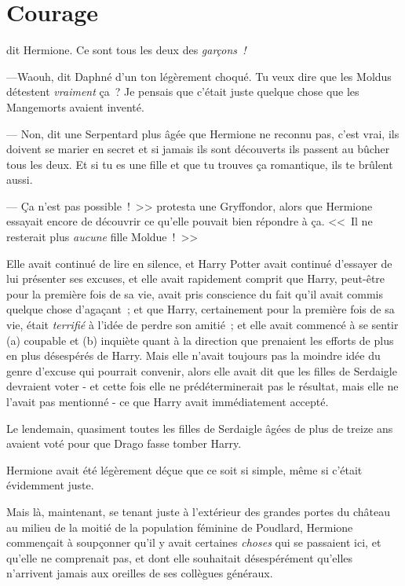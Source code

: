\chapter{Courage}

 dit Hermione. Ce sont tous les deux des \emph{garçons~!}

\hplettrineextrapara
---Waouh, dit Daphné d'un ton légèrement choqué. Tu veux dire que les Moldus détestent \emph{vraiment} ça~? Je pensais que c'était juste quelque chose que les Mangemorts avaient inventé.

--- Non, dit une Serpentard plus âgée que Hermione ne reconnu pas, c'est vrai, ils doivent se marier en secret et si jamais ils sont découverts ils passent au bûcher tous les deux. Et si tu es une fille et que tu trouves ça romantique, ils te brûlent aussi.

--- Ça n'est pas possible~!~>> protesta une Gryffondor, alors que Hermione essayait encore de découvrir ce qu'elle pouvait bien répondre à ça. <<~Il ne resterait plus \emph{aucune} fille Moldue~!~>>

Elle avait continué de lire en silence, et Harry Potter avait continué d'essayer de lui présenter ses excuses, et elle avait rapidement comprit que Harry, peut-être pour la première fois de sa vie, avait pris conscience du fait qu'il avait commis quelque chose d'agaçant~; et que Harry, certainement pour la première fois de sa vie, était \emph{terrifié} à l'idée de perdre son amitié~; et elle avait commencé à se sentir (a) coupable et (b) inquiète quant à la direction que prenaient les efforts de plus en plus désespérés de Harry. Mais elle n'avait toujours pas la moindre idée du genre d'excuse qui pourrait convenir, alors elle avait dit que les filles de Serdaigle devraient voter - et cette fois elle ne prédéterminerait pas le résultat, mais elle ne l'avait pas mentionné - ce que Harry avait immédiatement accepté.

Le lendemain, quasiment toutes les filles de Serdaigle âgées de plus de treize ans avaient voté pour que Drago fasse tomber Harry.

Hermione avait été légèrement déçue que ce soit si simple, même si c'était évidemment juste.

Mais là, maintenant, se tenant juste à l'extérieur des grandes portes du château au milieu de la moitié de la population féminine de Poudlard, Hermione commençait à soupçonner qu'il y avait certaines \emph{choses} qui se passaient ici, et qu'elle ne comprenait pas, et dont elle souhaitait désespérément qu'elles n'arrivent jamais aux oreilles de ses collègues généraux.

